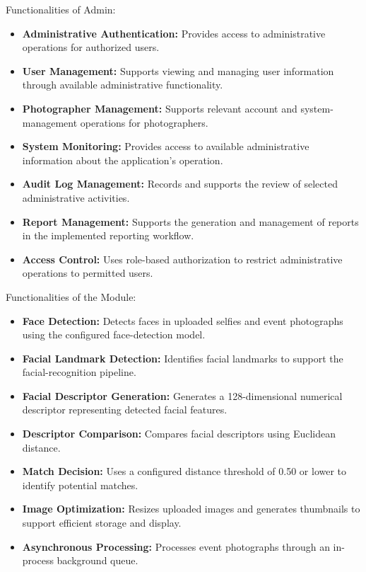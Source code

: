 
Functionalities of Admin:

\begin{itemize}
    \item \textbf{Administrative Authentication: } \noindent Provides access to administrative operations for authorized users.
    \item \textbf{User Management: } \noindent Supports viewing and managing user information through available administrative functionality.
    \item \textbf{Photographer Management: } \noindent Supports relevant account and system-management operations for photographers.
    \item \textbf{System Monitoring: } \noindent Provides access to available administrative information about the application's operation.
    \item \textbf{Audit Log Management: } \noindent Records and supports the review of selected administrative activities.
    \item \textbf{Report Management: } \noindent Supports the generation and management of reports in the implemented reporting workflow.
    \item \textbf{Access Control: } \noindent Uses role-based authorization to restrict administrative operations to permitted users.
\end{itemize}


Functionalities of the Module:
\begin{itemize}
    \item \textbf{Face Detection: } \noindent Detects faces in uploaded selfies and event photographs using the configured face-detection model.
    \item \textbf{Facial Landmark Detection: } \noindent Identifies facial landmarks to support the facial-recognition pipeline.
    \item \textbf{Facial Descriptor Generation: } \noindent Generates a 128-dimensional numerical descriptor representing detected facial features.
    \item \textbf{Descriptor Comparison: } \noindent Compares facial descriptors using Euclidean distance.
    \item \textbf{Match Decision: } \noindent Uses a configured distance threshold of 0.50 or lower to identify potential matches.
    \item \textbf{Image Optimization: } \noindent Resizes uploaded images and generates thumbnails to support efficient storage and display.
    \item \textbf{Asynchronous Processing: } \noindent Processes event photographs through an in-process background queue.
\end{itemize}

